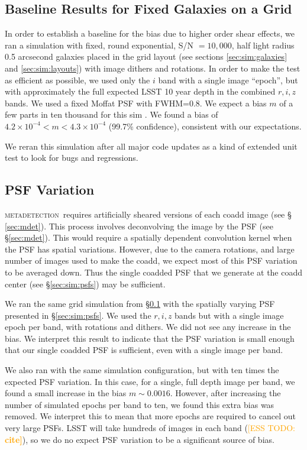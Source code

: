 \documentclass[iop, twocolappendix, appendixfloats, numberedappendix, apj]{hackemulateapj}
\newcommand{\esstodo}[1]{\textcolor{orange}{[ESS TODO: \bf #1]}}
\newcommand{\mdet}{\textsc{metadetection}}
\begin{document}
\subsection{Baseline Results for Fixed Galaxies on a Grid} \label{sec:results:base}

In order to establish a baseline for the bias due to higher order shear
effects, we ran a simulation with fixed, round exponential, S/N $= 10,000$,
half light radius 0.5 arcsecond galaxies placed in the grid layout (see
sections \ref{sec:sim:galaxies} and \ref{sec:sim:layouts}) with image dithers
and rotations.  In order to make the test as efficient as possible, we used
only the $i$ band with a single image ``epoch'', but with approximately the
full expected LSST 10 year depth in the combined $r, i, z$ bands.  We used a
fixed Moffat PSF\citep{Moffat1969} with FWHM=0.8.  We expect a bias $m$ of a
few parts in ten thousand for this sim \citep{SheldonMcal2017}.  We found a
bias of $4.2\times 10^{-4} < m < 4.3\times 10^{-4}$ (99.7\% confidence),
consistent with our expectations.

We reran this simulation after all major code updates as a kind of extended
unit test to look for bugs and regressions.

\subsection{PSF Variation} \label{sec:results:psfvar}

\mdet\ requires artificially sheared versions of each coadd image (see \S
\ref{sec:mdet}).  This process involves deconvolving the image by the PSF (see
\S \ref{sec:mdet}).  This would require a spatially dependent convolution
kernel when the PSF has spatial variations.  However, due to the camera
rotations, and large number of images used to make the coadd, we expect most of
this PSF variation to be averaged down.  Thus the single coadded PSF that we
generate at the coadd center (see \S \ref{sec:sim:psfs}) may be sufficient.

We ran the same grid simulation from \S \ref{sec:results:base} with the
spatially varying PSF presented in \S \ref{sec:sim:psfs}. We used the $r, i, z$
bands but with a single image epoch per band, with rotations and dithers. We
did not see any increase in the bias.   We interpret this result to indicate
that the PSF variation is small enough that our single coadded PSF is
sufficient, even with a single image per band.

We also ran with the same simulation configuration, but with ten times the
expected PSF variation. In this case, for a single, full depth image per band,
we found a small increase in the bias $m \sim 0.0016$.  However, after
increasing the number of simulated epochs per band to ten, we found this extra
bias was removed.  We interpret this to mean that more epochs are required to
cancel out very large PSFs.  LSST will take hundreds of images in each band
(\esstodo{cite}), so we do no expect PSF variation to be a significant source
of bias.
\end{document}
